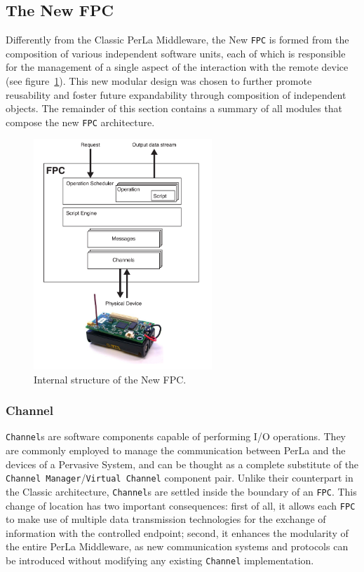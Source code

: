 \subsection{The New FPC}

Differently from the Classic PerLa Middleware, the New \texttt{FPC} is formed
from the composition of various independent software units, each of which is
responsible for the management of a single aspect of the interaction with the
remote device (see figure~\ref{fig:fpc_overview}). This new modular design was
chosen to further promote reusability and foster future expandability through
composition of independent objects. The remainder of this section contains a
summary of all modules that compose the new \texttt{FPC} architecture.

\begin{figure}[h!]
\center
\includegraphics[width=0.6\textwidth]{imgs/fpc.pdf}
\caption{Internal structure of the New FPC.}
\label{fig:fpc_overview}
\end{figure}

\subsubsection{Channel}

\texttt{Channel}s are software components capable of performing I/O operations.
They are commonly employed to manage the communication between PerLa and the
devices of a Pervasive System, and can be thought as a complete substitute of
the \texttt{Channel Manager}/\texttt{Virtual Channel} component pair. Unlike
their counterpart in the Classic architecture, \texttt{Channel}s are settled
inside the boundary of an \texttt{FPC}. This change of location has two
important consequences: first of all, it allows each \texttt{FPC} to make use
of multiple data transmission technologies for the exchange of information with
the controlled endpoint; second, it enhances the modularity of the entire PerLa
Middleware, as new communication systems and protocols can be introduced
without modifying any existing \texttt{Channel} implementation.

